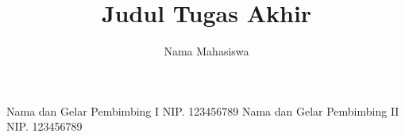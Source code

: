 \title{Judul Tugas Akhir} 	%
\author{Nama Mahasiswa}		%
\dosbingA%
    {Nama dan Gelar Pembimbing I}%
    {NIP. 123456789}				%
\dosbingB%
    {Nama dan Gelar Pembimbing II}%
    {NIP. 123456789}				%

\setcounter{page}{0}











\tableofcontents
\listoffigures
\listoftables
